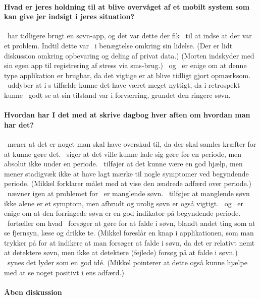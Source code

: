 \paragraph{Hvad er jeres holdning til at blive overvåget af et mobilt system som kan give jer indsigt i jeres situation?}
\pc~har tidligere brugt en søvn-app, og det var dette der fik \pc~til at indse at der var et problem.
Indtil dette var \pc~i benægtelse omkring sin lidelse.
(Der er lidt diskussion omkring opbevaring og deling af privat data.)
(Morten indskyder med sin egen app til registrering af stress via sms-brug.)
\pa~og \pe~er enige om at denne type applikation er brugbar, da det vigtige er at blive tidligt gjort opmærksom.
\pa~uddyber at i \pa s tilfælde kunne det have været meget nyttigt, da i retrospekt kunne \pa~godt se at sin tilstand var i forværring, grundet den ringere søvn.

\paragraph{Hvordan har I det med at skrive dagbog hver aften om hvordan man har det?}
\pd~mener at det er noget man skal have overskud til, da der skal samles kræfter for at kunne gøre det.
\pe~siger at det ville kunne lade sig gøre før en periode, men absolut ikke under en periode.
\pe~tilføjer at det kunne være en god hjælp, men mener stadigvæk ikke at have lagt mærke til nogle symptomer ved begyndende periode.
(Mikkel forklarer målet med at vise den ændrede adfærd over periode.)
\pa~nævner igen at problemet for \pa~er manglende søvn.
\pe~tilføjer at manglende søvn ikke alene er et symptom, men afbrudt og urolig søvn er også vigtigt.
\pe~og \pd~er enige om at den forringede søvn er en god indikator på begyndende periode.
\pa~fortæller om hvad \pa~forsøger at gøre for at falde i søvn, blandt andet ting som at se fjernsyn, læse og drikke te.
(Mikkel foreslår en knap i applikationen, som man trykker på for at indikere at man forsøger at falde i søvn, da det er relativt nemt at detektere søvn, men ikke at detektere (fejlede) forsøg på at falde i søvn.)
\pa~synes det lyder som en god idé.
(Mikkel pointerer at dette også kunne hjælpe med at se noget positivt i ens adfærd.)

\paragraph{Åben diskussion}

